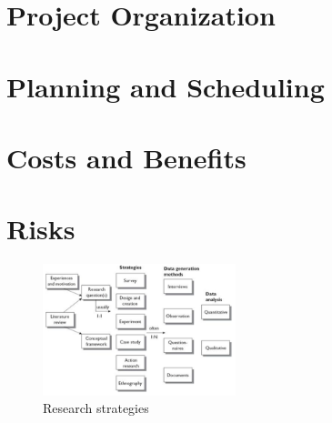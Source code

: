 \documentclass[11pt, a4paper]{article}
\begin{document}
\section{Project Organization}

\section{Planning and Scheduling}

\section{Costs and Benefits}\label{costsandbenefits}

\section{Risks}

\begin{figure}[h]
    \center
    \includegraphics[width=0.5\textwidth]{research-strategies.png}
    \caption{Research strategies \cite{oates2005researching}}
    \label{fig:research_strategies}
\end{figure}

\printbibliography 
\pagebreak

\end{document}
